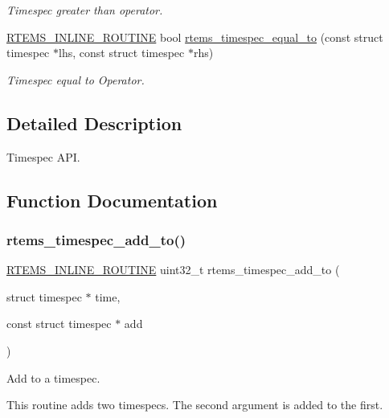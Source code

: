 \begin{DoxyCompactItemize}
\begin{DoxyCompactList}\small\item\em Timespec greater than operator. \end{DoxyCompactList}\item 
\mbox{\hyperlink{group__RTEMSScoreBaseDefs_gac216239df231d5dbd15e3520b0b9313f}{R\+T\+E\+M\+S\+\_\+\+I\+N\+L\+I\+N\+E\+\_\+\+R\+O\+U\+T\+I\+NE}} bool \mbox{\hyperlink{group__TimespecAPI_ga88ed85b0dc9b6bd01ff66626279157d0}{rtems\+\_\+timespec\+\_\+equal\+\_\+to}} (const struct timespec $\ast$lhs, const struct timespec $\ast$rhs)
\begin{DoxyCompactList}\small\item\em Timespec equal to Operator. \end{DoxyCompactList}\end{DoxyCompactItemize}


\subsection{Detailed Description}
Timespec A\+PI. 



\subsection{Function Documentation}
\mbox{\label{group__TimespecAPI_ga62a5abddb03243a3f566abf063cc2349}} 
\subsubsection{\texorpdfstring{rtems\_timespec\_add\_to()}{rtems\_timespec\_add\_to()}}
{\footnotesize\ttfamily \mbox{\hyperlink{group__RTEMSScoreBaseDefs_gac216239df231d5dbd15e3520b0b9313f}{R\+T\+E\+M\+S\+\_\+\+I\+N\+L\+I\+N\+E\+\_\+\+R\+O\+U\+T\+I\+NE}} uint32\+\_\+t rtems\+\_\+timespec\+\_\+add\+\_\+to (\begin{DoxyParamCaption}\item[{struct timespec $\ast$}]{time,  }\item[{const struct timespec $\ast$}]{add }\end{DoxyParamCaption})}



Add to a timespec. 

This routine adds two timespecs. The second argument is added to the first.


